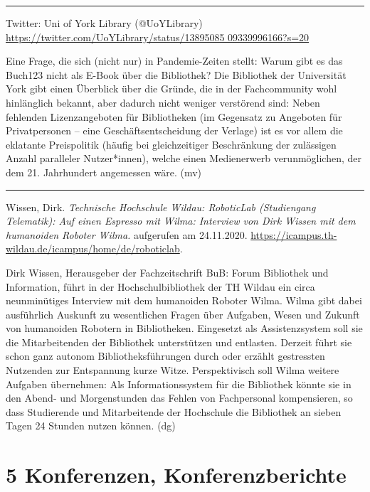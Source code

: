 \documentclass[a4paper,
fontsize=11pt,
oneside,
numbers=noperiodatend,
parskip=half-,
bibliography=totoc,
final
]{scrartcl}
\begin{document}
\begin{center}\rule{0.5\linewidth}{0.5pt}\end{center}

Twitter: Uni of York Library (@UoYLibrary)
\href{https://twitter.com/UoYLibrary/status/1389508509339996166?s=20}{https://twitter.com/UoYLibrary/status/13895085 09339996166?s=20}

Eine Frage, die sich (nicht nur) in Pandemie-Zeiten stellt: Warum gibt
es das Buch123 nicht als E-Book über die Bibliothek? Die Bibliothek der
Universität York gibt einen Überblick über die Gründe, die in der
Fachcommunity wohl hinlänglich bekannt, aber dadurch nicht weniger
verstörend sind: Neben fehlenden Lizenzangeboten für Bibliotheken (im
Gegensatz zu Angeboten für Privatpersonen -- eine Geschäftsentscheidung
der Verlage) ist es vor allem die eklatante Preispolitik (häufig bei
gleichzeitiger Beschränkung der zulässigen Anzahl paralleler
Nutzer*innen), welche einen Medienerwerb verunmöglichen, der dem 21.
Jahrhundert angemessen wäre. (mv)

\begin{center}\rule{0.5\linewidth}{0.5pt}\end{center}

Wissen, Dirk. \emph{Technische Hochschule Wildau: RoboticLab
(Studiengang Telematik): Auf einen Espresso mit Wilma: Interview von
Dirk Wissen mit dem humanoiden Roboter Wilma.} aufgerufen am 24.11.2020.
\url{https://icampus.th-wildau.de/icampus/home/de/roboticlab}.

Dirk Wissen, Herausgeber der Fachzeitschrift BuB: Forum Bibliothek und
Information, führt in der Hochschulbibliothek der TH Wildau ein circa
neunminütiges Interview mit dem humanoiden Roboter Wilma. Wilma gibt
dabei ausführlich Auskunft zu wesentlichen Fragen über Aufgaben, Wesen
und Zukunft von humanoiden Robotern in Bibliotheken. Eingesetzt als
Assistenzsystem soll sie die Mitarbeitenden der Bibliothek unterstützen
und entlasten. Derzeit führt sie schon ganz autonom Bibliotheksführungen
durch oder erzählt gestressten Nutzenden zur Entspannung kurze Witze.
Perspektivisch soll Wilma weitere Aufgaben übernehmen: Als
Informationssystem für die Bibliothek könnte sie in den Abend- und
Morgenstunden das Fehlen von Fachpersonal kompensieren, so dass
Studierende und Mitarbeitende der Hochschule die Bibliothek an sieben
Tagen 24 Stunden nutzen können. (dg)

\hypertarget{konferenzen-konferenzberichte}{%
\section{5 Konferenzen,
Konferenzberichte}\label{konferenzen-konferenzberichte}}
\end{document}
